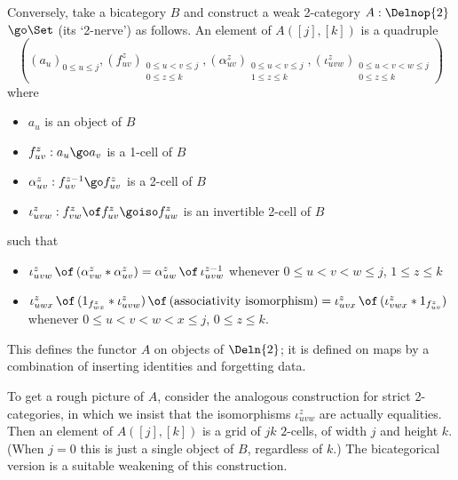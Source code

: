 Conversely, take a bicategory $B$ and construct a weak 2-category $A:
\Delnop{2}$\linebreak$\go \Set$ (its `2-nerve') as follows.  An element of
$A([j],[k])$ is a quadruple
%
\renewcommand{\arraystretch}{0.8}	
%
\[
((a_u)_{0\leq u\leq j},
(f_{uv}^z)_{\begin{array}{cc} \scriptstyle
	0\leq u < v\leq j\\ \scriptstyle
	0\leq z \leq k
	\end{array}},
(\alpha_{uv}^z)_{\begin{array}{cc} \scriptstyle
	0\leq u < v \leq j\\ \scriptstyle
	1\leq z \leq k
	\end{array}},
(\iota_{uvw}^z)_{\begin{array}{cc} \scriptstyle
	0\leq u < v < w \leq j\\ \scriptstyle
	0 \leq z \leq k
	\end{array}})
\]
%
\renewcommand{\arraystretch}{1}		
%
where
%
\begin{itemize}
\item $a_u$ is an object of $B$
\item $f_{uv}^z: a_u \go a_v$ is a 1-cell of $B$
\item $\alpha_{uv}^z: f_{uv}^{z-1} \go f_{uv}^z$ is a
2-cell of $B$
\item $\iota_{uvw}^z: f_{vw}^z \of f_{uv}^z 
\goiso f_{uw}^z$ is an invertible 2-cell of $B$ 
\end{itemize}
such that
\begin{itemize}
\item $\iota_{uvw}^z \,\of\, (\alpha_{vw}^z * \alpha_{uv}^z) =
\alpha_{uw}^z \,\of\, \iota_{uvw}^{z-1}$ 
whenever $0\leq u < v < w \leq j$, $1\leq z \leq k$
\item $\iota_{uwx}^z \,\of\, (1_{f_{wx}^z} * \iota_{uvw}^z)
\,\of\, (\textrm{associativity isomorphism})
=
\iota_{uvx}^z \,\of\, (\iota_{vwx}^z * 1_{f_{uv}^z})$
whenever $0\leq u < v < w < x \leq j$, $0\leq z \leq k$.
\end{itemize}
%
This defines the functor $A$ on objects of $\Deln{2}$; it is defined on maps
by a combination of inserting identities and forgetting data.

To get a rough picture of $A$, consider the analogous construction for
strict 2-categories, in which we insist that the isomorphisms
$\iota_{uvw}^z$ are actually equalities.  Then an element of
$A([j],[k])$ is a grid of $jk$ $2$-cells, of width $j$ and height $k$.  (When
$j=0$ this is just a single object of $B$, regardless of $k$.)  The
bicategorical version is a suitable weakening of this construction.

